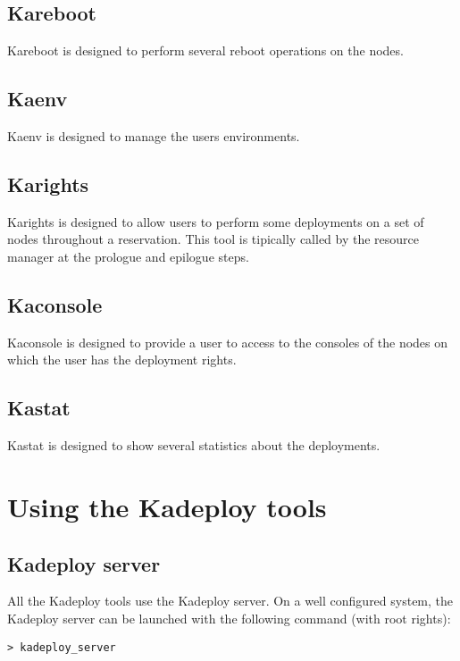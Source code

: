 \documentclass[a4wide,10pt,oneside]{book}
\begin{document}
\subsection{Kareboot}
Kareboot is designed to perform several reboot operations on the nodes.

\subsection{Kaenv}
Kaenv is designed to manage the users environments.

\subsection{Karights}
Karights is designed to allow users to perform some deployments on a set of nodes throughout a reservation. This tool is tipically called by the resource manager at the prologue and epilogue steps.

\subsection{Kaconsole}
Kaconsole is designed to provide a user to access to the consoles of the nodes on which the user has the deployment rights.

\subsection{Kastat}
Kastat is designed to show several statistics about the deployments.

\section{Using the Kadeploy tools}
\subsection{Kadeploy server}
All the Kadeploy tools use the Kadeploy server. On a well configured system, the Kadeploy server can be launched with the following command (with root rights):
\begin{verbatim}
> kadeploy_server
\end{verbatim}
\end{document}
